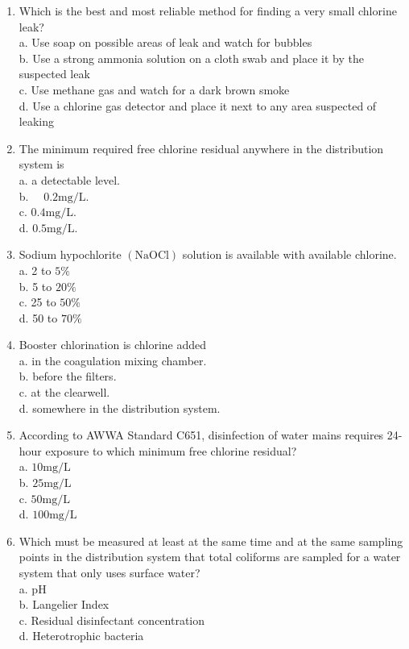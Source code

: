 \documentclass[10pt]{article}
\begin{document}
\begin{enumerate}
  \item Which is the best and most reliable method for finding a very small chlorine leak?\\
a. Use soap on possible areas of leak and watch for bubbles\\
b. Use a strong ammonia solution on a cloth swab and place it by the suspected leak\\
c. Use methane gas and watch for a dark brown smoke\\
d. Use a chlorine gas detector and place it next to any area suspected of leaking

  \item The minimum required free chlorine residual anywhere in the distribution system is\\
a. a detectable level.\\
b. $\quad 0.2 \mathrm{mg} / \mathrm{L}$.\\
c. $0.4 \mathrm{mg} / \mathrm{L}$.\\
d. $0.5 \mathrm{mg} / \mathrm{L}$.

  \item Sodium hypochlorite $(\mathrm{NaOCl})$ solution is available with available chlorine.\\
a. 2 to $5 \%$\\
b. 5 to $20 \%$\\
c. 25 to $50 \%$\\
d. 50 to $70 \%$

  \item Booster chlorination is chlorine added\\
a. in the coagulation mixing chamber.\\
b. before the filters.\\
c. at the clearwell.\\
d. somewhere in the distribution system.

  \item According to AWWA Standard C651, disinfection of water mains requires 24-hour exposure to which minimum free chlorine residual?\\
a. $10 \mathrm{mg} / \mathrm{L}$\\
b. $25 \mathrm{mg} / \mathrm{L}$\\
c. $50 \mathrm{mg} / \mathrm{L}$\\
d. $100 \mathrm{mg} / \mathrm{L}$

  \item Which must be measured at least at the same time and at the same sampling points in the distribution system that total coliforms are sampled for a water system that only uses surface water?\\
a. $\mathrm{pH}$\\
b. Langelier Index\\
c. Residual disinfectant concentration\\
d. Heterotrophic bacteria 


\end{enumerate}
\end{document}
